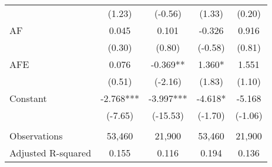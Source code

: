 \begin{table}[H]
\begin{center}
\begin{tabular}{lcccc}
			& (1.23) & (-0.56) & (1.33) & (0.20) \\
			AF & 0.045 & 0.101 & -0.326 & 0.916 \\
			& (0.30) & (0.80) & (-0.58) & (0.81) \\
			AFE & 0.076 & -0.369** & 1.360* & 1.551 \\
			& (0.51) & (-2.16) & (1.83) & (1.10) \\
			Constant & -2.768*** & -3.997*** & -4.618* & -5.168 \\
			& (-7.65) & (-15.53) & (-1.70) & (-1.06) \\
			&   &   &   &  \\
			Observations & 53,460 & 21,900 & 53,460 & 21,900 \\
			Adjusted R-squared & 0.155 & 0.116 & 0.194 & 0.136 \\
			\bottomrule
			\bottomrule
		\end{tabular}%
	\end{center}
\end{table}%